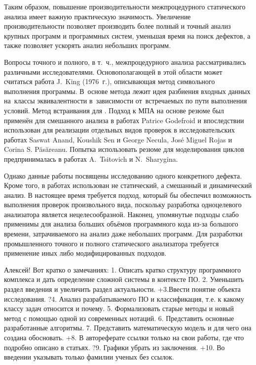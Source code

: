 Таким образом, повышение производительности межпроцедурного статического анализа имеет важную практическую значимость. Увеличение производительности позволяет производить более полный и точный анализ крупных программ и программных систем, уменьшая время на поиск дефектов, а также позволяет ускорять анализ небольших программ.

Вопросы точного и полного, в т.~ч., межпроцедурного анализа рассматривались различными исследователями. Основополагающей в этой области может считаться работа J.~King (1976~г.), описывающая метод символьного выполнения программы. В~основе метода лежит идея разбиения входных данных на~классы эквивалентности в~зависимости от~встречаемых по пути выполнения условий. Метод встраивания для  . Подход к МПА на основе резюме был применён для смешанного анализа в работах Patrice Godefroid и впоследствии использован для реализации отдельных видов проверок в исследовательских работах Saswat Anand, Koushik Sen и George Necula, Jos\'{e} Miguel Rojas и Corina S. P\u{a}s\u{a}reanu. Попытка использовать резюме для моделирования циклов предпринималась в работах A.~Tsitovich и N.~Sharygina.

Однако данные работы посвящены исследованию одного конкретного дефекта. Кроме того, в работах использован не статический, а смешанный и динамический анализ. В настоящее время требуется подход, который бы обеспечил возможность выполнения проверок произвольного вида, поскольку разработка одноцелевого анализатора является нецелесообразной. Наконец, упомянутые подходы слабо применимы для анализа больших объёмов программного кода из-за большого времени, затрачиваемого на анализ даже небольших программ. Для разработки промышленного точного и полного статического анализатора требуется применение иных либо модифицированных подходов.



 Алексей!
Вот кратко о замечаниях:
1. Описать кратко структуру программного  комплекса и дать определение сложной системы в контексте ПО.
2. Уменьшить раздел введения и увеличить раздел актуальности. 
+3.Ввести понятие объекта исследования.
?4. Анализ разрабатываемого ПО и классификация, т.е. к какому классу задач относится и почему.
5. Формализовать старые методы и новый метод с помощью одной из современных нотаций.
6. Представить основные разработанные алгоритмы.
7. Представить математическую модель и для чего она создана обосновать.
+8. В автореферате ссылки только на свои работы, где что подробно описано в статьях.
?9. Графики убрать из заключения.
+10. Во введении указывать только фамилии ученых без ссылок.

